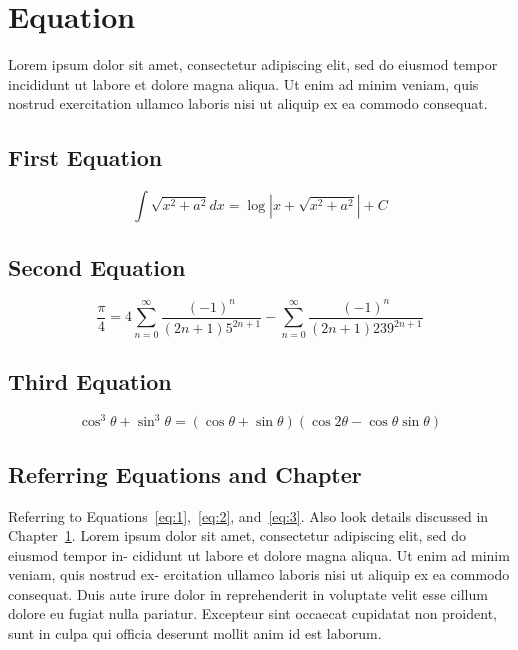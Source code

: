 \chapter{Equation}
\label{ch2}
Lorem ipsum dolor sit amet, consectetur adipiscing elit, sed do eiusmod tempor incididunt
ut labore et dolore magna aliqua. Ut enim ad minim veniam, quis nostrud exercitation
ullamco laboris nisi ut aliquip ex ea commodo consequat. 

\section{First Equation}
\begin{equation}
    \int \sqrt{ x^2 + a^2  } dx =  \log | x+ \sqrt{ x^2 + a^2 } | + C
    \label{eq:1}
\end{equation}

\section{Second Equation}
\begin{equation}
    \frac{\pi}{4} = 4 \sum\limits_{n=0}^\infty \frac{(-1)^n}{(2n+1)5^{2n+1}}  -	\sum\limits_{n=0}^\infty \frac{(-1)^n}{(2n+1)239^{2n+1}} 
    \label{eq:2}
\end{equation}

\section{Third Equation}
\begin{equation}
    \cos^ 3 {\theta} + \sin^ 3 {\theta} = (\cos {\theta} + \sin {\theta})(\cos {2\theta} - \cos{\theta}\sin{\theta})
    \label{eq:3}
\end{equation}

\section{Referring Equations and Chapter}
Referring to Equations~\ref{eq:1},~\ref{eq:2}, and~\ref{eq:3}. Also look details discussed in Chapter~\ref{ch2}.
Lorem ipsum dolor sit amet, consectetur adipiscing elit, sed do eiusmod tempor in-
cididunt ut labore et dolore magna aliqua. Ut enim ad minim veniam, quis nostrud ex-
ercitation ullamco laboris nisi ut aliquip ex ea commodo consequat. Duis aute irure dolor
in reprehenderit in voluptate velit esse cillum dolore eu fugiat nulla pariatur. Excepteur
sint occaecat cupidatat non proident, sunt in culpa qui officia deserunt mollit anim id est
laborum.

